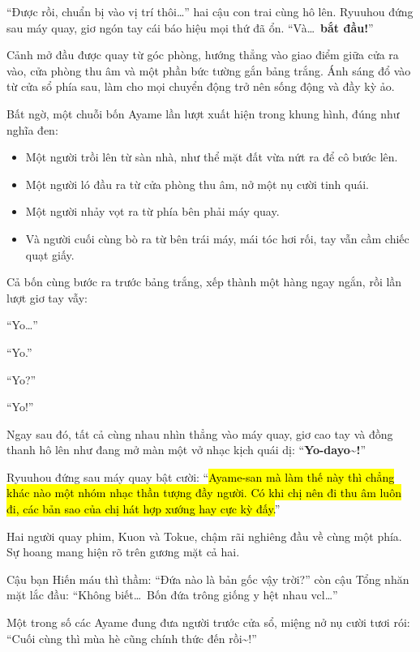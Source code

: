 \documentclass[../main.tex]{subfiles}
\begin{document}
``Được rồi, chuẩn bị vào vị trí thôi\dots'' hai cậu con trai cùng hô lên. Ryuuhou đứng sau máy quay, giơ ngón tay cái báo hiệu mọi thứ đã ổn. ``Và\dots\ \textbf{bắt đầu!}''

\il

Cảnh mở đầu được quay từ góc phòng, hướng thẳng vào giao điểm giữa cửa ra vào, cửa phòng thu âm và một phần bức tường gắn bảng trắng. Ánh sáng đổ vào từ cửa sổ phía sau, làm cho mọi chuyển động trở nên sống động và đầy kỳ ảo.

Bất ngờ, một chuỗi bốn Ayame lần lượt xuất hiện trong khung hình, đúng như nghĩa đen:

\begin{itemize}
  \item Một người trồi lên từ sàn nhà, như thể mặt đất vừa nứt ra để cô bước lên.
  \item Một người ló đầu ra từ cửa phòng thu âm, nở một nụ cười tinh quái.
  \item Một người nhảy vọt ra từ phía bên phải máy quay.
  \item Và người cuối cùng bò ra từ bên trái máy, mái tóc hơi rối, tay vẫn cầm chiếc quạt giấy.
\end{itemize}

Cả bốn cùng bước ra trước bảng trắng, xếp thành một hàng ngay ngắn, rồi lần lượt giơ tay vẫy:

``Yo\dots''

``Yo.''

``Yo?''

``Yo!''

Ngay sau đó, tất cả cùng nhau nhìn thẳng vào máy quay, giơ cao tay và đồng thanh hô lên như đang mở màn một vở nhạc kịch quái dị: ``\textbf{Yo-dayo\~{}!}''


Ryuuhou đứng sau máy quay bật cười: ``\hl{Ayame-san mà làm thế này thì chẳng khác nào một nhóm nhạc thần tượng đầy người. Có khi chị nên đi thu âm luôn đi, các bản sao của chị hát hợp xướng hay cực kỳ đấy.}''

Hai người quay phim, Kuon và Tokue, chậm rãi nghiêng đầu về cùng một phía. Sự hoang mang hiện rõ trên gương mặt cả hai.

Cậu bạn Hiến máu thì thầm: ``Đứa nào là bản gốc vậy trời?'' còn cậu Tổng nhăn mặt lắc đầu: ``Không biết\dots\ Bốn đứa trông giống y hệt nhau vcl\dots''

Một trong số các Ayame đung đưa người trước cửa sổ, miệng nở nụ cười tươi rói: ``Cuối cùng thì mùa hè cũng chính thức đến rồi\~{}!''
\end{document}
